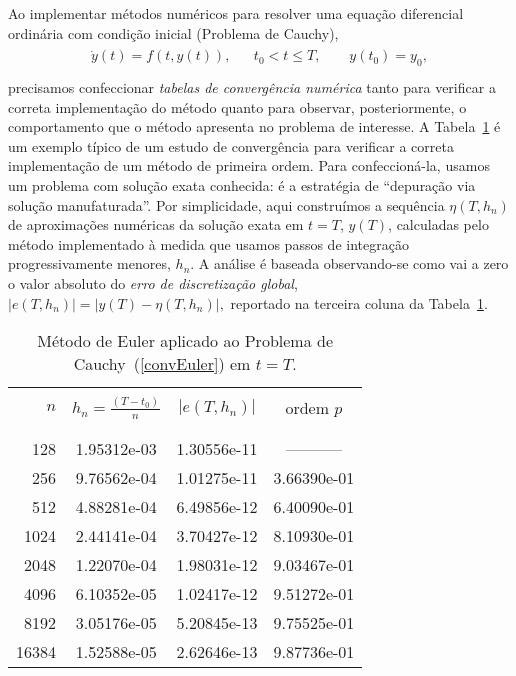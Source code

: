 \documentclass{article}
\begin{document}
Ao implementar métodos numéricos para resolver   uma equação diferencial ordinária com condição inicial (Problema de Cauchy), 
\begin{eqnarray}\label{convEuler}
    \begin{array}{rcl}
    \dot{y}(t)  = f(t,y(t)), & & t_0<t\le T,\qquad y(t_0) = y_0,\\
    \end{array} 
\end{eqnarray}
precisamos confeccionar {\it tabelas de convergência numérica} tanto para veri\-ficar a correta implementação do método quanto para observar, posteriormente, o comportamento que o método apresenta no problema de interesse.
A Tabela~\ref{tabmodel-1} é um exemplo típico de um estudo de convergência para verificar a correta implementação de um método de primeira ordem. Para confeccioná-la, usamos um problema com solução exata conhecida: é a estratégia de ``depuração via solução manufaturada''. Por simplicidade, aqui construímos a sequência $\eta(T,h_n)$ de aproximações numéricas da solução exata em $t=T$, $y(T)$, calculadas pelo método implementado  à medida que usa\-mos passos de integração progressivamente menores, $h_n$. A análise é baseada  observando-se como  vai a zero o valor absoluto do {\it erro de discretização global}, 
$\left|e(T, h_n)\right|=\left|y(T)-\eta(T,h_n)\right|,$ reportado na terceira coluna da Tabela~\ref{tabmodel-1}.

\begin{table}[!ht]
\centering
\begin{tabular}{rccc}\hline\hline\\
 $n$ &$h_n=\displaystyle \frac{(T-t_0)}{n}$ & $\left|e(T, h_n)\right|$  & ordem $p$\\\\
	\hline\hline
	\\
  128 &  1.95312e-03 &  1.30556e-11 &  ----------- \\
  256 &  9.76562e-04 &  1.01275e-11 &  3.66390e-01 \\
  512 &  4.88281e-04 &  6.49856e-12 &  6.40090e-01 \\
 1024 &  2.44141e-04 &  3.70427e-12 &  8.10930e-01 \\
 2048 &  1.22070e-04 &  1.98031e-12 &  9.03467e-01 \\
 4096 &  6.10352e-05 &  1.02417e-12 &  9.51272e-01 \\
 8192 &  3.05176e-05 &  5.20845e-13 &  9.75525e-01 \\
16384 &  1.52588e-05 &  2.62646e-13 &  9.87736e-01 \\
		\hline\hline
\end{tabular}
\caption{Método de Euler aplicado ao Problema de Cauchy~(\ref{convEuler}) em $t=T$. 
}
\label{tabmodel-1}
\end{table}
\end{document}
